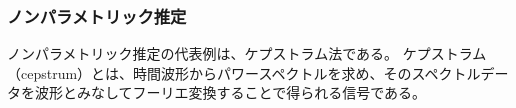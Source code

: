 \subsubsection{ノンパラメトリック推定}

ノンパラメトリック推定の代表例は、ケプストラム法である。
ケプストラム（cepstrum）とは、時間波形からパワースペクトルを求め、そのスペクトルデータを波形とみなしてフーリエ変換することで得られる信号である。





